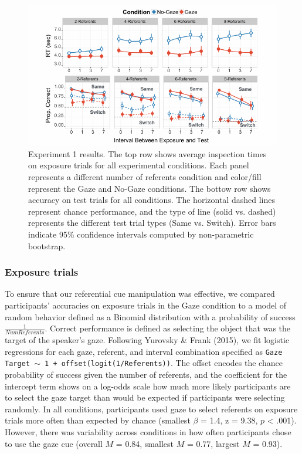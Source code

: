 \documentclass[authoryear, review]{elsarticle}
\newenvironment{CodeChunk}{}{}
\begin{document}
\begin{CodeChunk}
\begin{figure}[tb]
\includegraphics{figs/expt1-plot-1} \caption[Experiment 1 results]{Experiment 1 results. The top row shows average inspection times on exposure trials for all experimental conditions. Each panel represents a different number of referents condition and color/fill represent the Gaze and No-Gaze conditions. The bottow row shows accuracy on test trials for all conditions. The horizontal dashed lines represent chance performance, and the type of line (solid vs. dashed) represents the different test trial types (Same vs. Switch). Error bars indicate 95\% confidence intervals computed by non-parametric bootstrap.}\label{fig:expt1-plot}
\end{figure}
\end{CodeChunk}

\subsubsection{Exposure trials}\label{exposure-trials}

To ensure that our referential cue manipulation was effective, we
compared participants' accuracies on exposure trials in the Gaze
condition to a model of random behavior defined as a Binomial
distribution with a probability of success \(\frac{1}{Num Referents}\).
Correct performance is defined as selecting the object that was the
target of the speaker's gaze. Following Yurovsky \& Frank (2015), we fit
logistic regressions for each gaze, referent, and interval combination
specified as \texttt{Gaze Target $\sim$ 1 + offset(logit(1/Referents))}.
The offset encodes the chance probability of success given the number of
referents, and the coefficient for the intercept term shows on a
log-odds scale how much more likely participants are to select the gaze
target than would be expected if participants were selecting randomly.
In all conditions, participants used gaze to select referents on
exposure trials more often than expected by chance (smallest \(\beta\) =
1.4, z = 9.38, \(p\) \textless{} .001). However, there was variability
across conditions in how often participants chose to use the gaze cue
(overall \(M\) = 0.84, smallest \(M\) = 0.77, largest \(M\) = 0.93).
\end{document}
